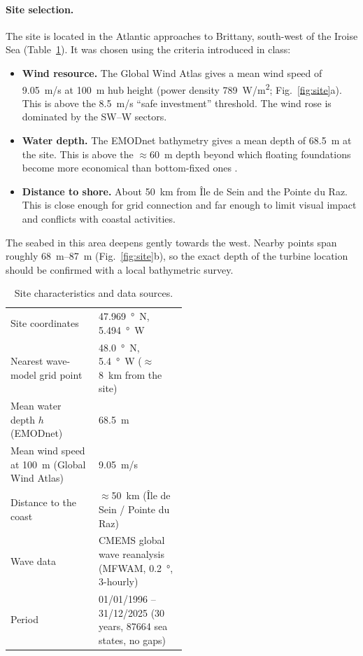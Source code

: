 \documentclass[11pt,a4paper]{article}
\begin{document}
\paragraph{Site selection.}
The site is located in the Atlantic approaches to Brittany, south-west of the Iroise Sea (Table~\ref{tab:site}).
It was chosen using the criteria introduced in class:
\begin{itemize}
  \item \textbf{Wind resource.} The Global Wind Atlas gives a mean wind speed of \SI{9.05}{m/s} at \SI{100}{m} hub height (power density \SI{789}{W/m^2}; Fig.~\ref{fig:site}a). This is above the \SI{8.5}{m/s} ``safe investment'' threshold. The wind rose is dominated by the SW--W sectors.
  \item \textbf{Water depth.} The EMODnet bathymetry gives a mean depth of \SI{68.5}{m} at the site. This is above the $\approx$\SI{60}{m} depth beyond which floating foundations become more economical than bottom-fixed ones \cite{windeurope2017}.
  \item \textbf{Distance to shore.} About \SI{50}{km} from Île de Sein and the Pointe du Raz. This is close enough for grid connection and far enough to limit visual impact and conflicts with coastal activities.
\end{itemize}
The seabed in this area deepens gently towards the west. Nearby points span roughly \SIrange{68}{87}{m} (Fig.~\ref{fig:site}b), so the exact depth of the turbine location should be confirmed with a local bathymetric survey.

\begin{table}[H]
\centering\small
\caption{Site characteristics and data sources.}
\label{tab:site}
\begin{tabular}{lp{0.5\linewidth}}
\toprule
Site coordinates & \SI{47.969}{\degree N}, \SI{5.494}{\degree W} \\
Nearest wave-model grid point & \SI{48.0}{\degree N}, \SI{5.4}{\degree W} ($\approx$\SI{8}{km} from the site) \\
Mean water depth $h$ (EMODnet) & \SI{68.5}{m} \\
Mean wind speed at \SI{100}{m} (Global Wind Atlas) & \SI{9.05}{m/s} \\
Distance to the coast & $\approx$\SI{50}{km} (Île de Sein / Pointe du Raz) \\
Wave data & CMEMS global wave reanalysis (MFWAM, \SI{0.2}{\degree}, 3-hourly) \cite{cmems} \\
Period & 01/01/1996 -- 31/12/2025 (30 years, \num{87664} sea states, no gaps) \\
\bottomrule
\end{tabular}
\end{table}
\end{document}
